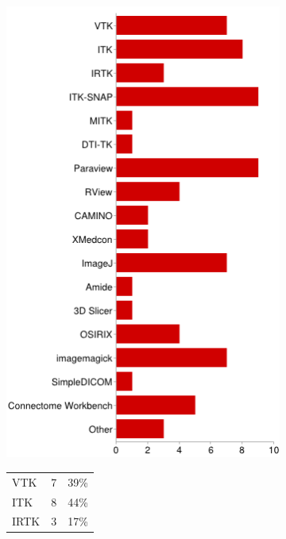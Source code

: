\documentclass[MSc,paper=a4,pagesize=auto]{icldt}
\begin{document}
\begin{figure}[htbp!]
\centering
\begin{subfigure}{0.4\textwidth}
    \centering
    \includegraphics[width=1\linewidth]{resources/3-medical_imaging_packages}
\end{subfigure}%
\centering
\begin{subfigure}{0.5\textwidth}
    \centering
   	\begin{tabular}{ l c r }
	VTK					&7&39\% \\
	ITK					&8&44\% \\
	IRTK					&3&17\% \\

\end{tabular}
\end{subfigure}
\end{figure}
\end{document}
